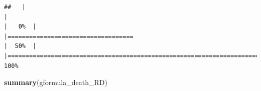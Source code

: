 \documentclass[
]{book}
\newenvironment{Shaded}{\begin{snugshade}}{\end{snugshade}}
\newcommand{\FunctionTok}[1]{\textcolor[rgb]{0.13,0.29,0.53}{\textbf{#1}}}
\newcommand{\NormalTok}[1]{#1}
\begin{document}
\begin{verbatim}
##   |                                                                              |                                                                      |   0%  |                                                                              |===================================                                   |  50%  |                                                                              |======================================================================| 100%
\end{verbatim}

\begin{Shaded}
\begin{Highlighting}[]
\FunctionTok{summary}\NormalTok{(gformula\_death\_RD)}
\end{Highlighting}
\end{Shaded}
\end{document}
